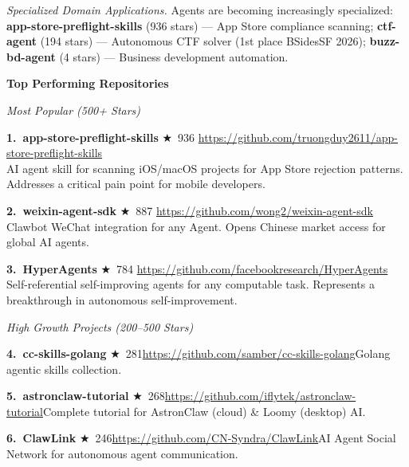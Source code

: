 \begin{mdframed}[
  linewidth=0.8pt,
  linecolor=black!40,
  backgroundcolor=black!2,
  innertopmargin=16pt,
  innerbottommargin=16pt,
  innerleftmargin=18pt,
  innerrightmargin=18pt,
  roundcorner=4pt
]
\vspace{4pt}
\noindent\textit{Specialized Domain Applications.}\quad
Agents are becoming increasingly specialized: \textbf{app-store-preflight-skills} (936 stars) --- App Store compliance scanning; \textbf{ctf-agent} (194 stars) --- Autonomous CTF solver (1st place BSidesSF 2026); \textbf{buzz-bd-agent} (4 stars) --- Business development automation.

\vspace{8pt}
\noindent\textbf{Top Performing Repositories}

\vspace{4pt}
\noindent\textit{Most Popular (500+ Stars)}

\vspace{2pt}
\noindent\textbf{1.~app-store-preflight-skills} $\bigstar$~936\quad
\url{https://github.com/truongduy2611/app-store-preflight-skills}\\
AI agent skill for scanning iOS/macOS projects for App Store rejection patterns. Addresses a critical pain point for mobile developers.

\vspace{4pt}
\noindent\textbf{2.~weixin-agent-sdk} $\bigstar$~887\quad
\url{https://github.com/wong2/weixin-agent-sdk}\\
Clawbot WeChat integration for any Agent. Opens Chinese market access for global AI agents.

\vspace{4pt}
\noindent\textbf{3.~HyperAgents} $\bigstar$~784\quad
\url{https://github.com/facebookresearch/HyperAgents}\\
Self-referential self-improving agents for any computable task. Represents a breakthrough in autonomous self-improvement.

\vspace{6pt}
\noindent\textit{High Growth Projects (200--500 Stars)}

\vspace{2pt}
\noindent\textbf{4.~cc-skills-golang} $\bigstar$~281\quad \url{https://github.com/samber/cc-skills-golang}\quad Golang agentic skills collection.

\noindent\textbf{5.~astronclaw-tutorial} $\bigstar$~268\quad \url{https://github.com/iflytek/astronclaw-tutorial}\quad Complete tutorial for AstronClaw (cloud) \& Loomy (desktop) AI.

\noindent\textbf{6.~ClawLink} $\bigstar$~246\quad \url{https://github.com/CN-Syndra/ClawLink}\quad AI Agent Social Network for autonomous agent communication.


\end{mdframed}
